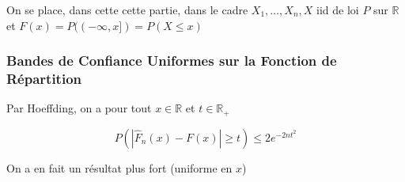 \documentclass[12pt]{article}
\newif\ifcorrection
\newcommand{\corr}[1]{\ifcorrection{\color{lightblue}#1\color{black}}\fi}
\newcommand{\petitespace}{\vspace{0.5cm}}
\newcommand{\bb}[1]{\mathbb{#1}} %
\newcommand{\R}{\bb{R}} %
\renewcommand{\cal}{\mathcal}
\newcommand{\Xunan}{X_1,\ldots,X_n} %
\newcommand{\esp}[1]{\bb{ E} \mathopen{}\left[#1\right]} %
\newcommand{\1}{\bb{1}} %
\begin{document}
%
%
%
%
%
%
% 
% 
%
%

On se place, dans cette cette partie, dans le cadre $\Xunan, X$ iid de loi $P$ sur $\R$ et $F(x) = P( (-\infty,x] ) = P(X \le x)$ 


\subsubsection{Bandes de Confiance Uniformes sur la Fonction de Répartition}\petitespace

Par Hoeffding, on a pour tout $x \in \R$ et $t \in \R_+$

$$P(|\widehat F_n(x)-F(x)| \ge t)\le 2e^{-2nt^2} $$

On a en fait un résultat plus fort (uniforme en $x$) 
\petitespace
\end{document}
